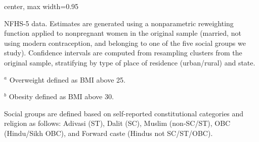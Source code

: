 \documentclass[12pt]{article}
\begin{document}
\newpage
\begin{landscape}
\begin{table}[!htbp]
\centering
\begin{adjustbox}{center, max width=0.95\linewidth} %
\begin{threeparttable}
    \small
    \caption{: Means and 95\% CIs for additional maternal nutrition indicators by social group}
    \label{tab:addnut}

    \setlength{\tabcolsep}{2pt}
    \renewcommand{\arraystretch}{2}

    

    \begin{tablenotes}
        \item NFHS-5 data. Estimates are generated using a nonparametric reweighting function applied to nonpregnant women in the original sample (married, not using modern contraception, and belonging to one of the five social groups we study). Confidence intervals are computed from resampling clusters from the original sample, stratifying by type of place of residence (urban/rural) and state.
        \item $^{a}$ Overweight defined as BMI above 25.
        \item $^{b}$ Obesity defined as BMI above 30.
        \item Social groups are defined based on self-reported constitutional categories and religion as follows: Adivasi (ST), Dalit (SC), Muslim  (non‐SC/ST), OBC (Hindu/Sikh OBC), and Forward caste (Hindus not SC/ST/OBC).
    \end{tablenotes}

\end{threeparttable}
\end{adjustbox}
\end{table}
\end{landscape}
\end{document}
